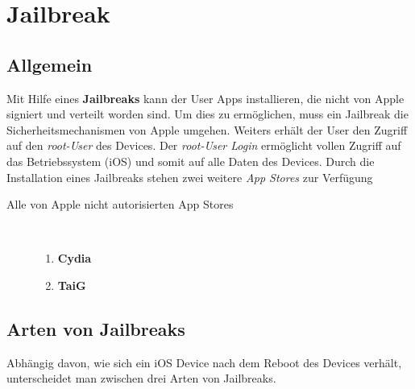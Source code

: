 %
%
% 
%
% 


\chapter{Jailbreak}
\label{ch:JB}

\section{Allgemein}
\label{sec:JBAllgemein}

Mit Hilfe eines \textbf{Jailbreaks} kann der User Apps installieren, die nicht von Apple signiert und verteilt worden sind. Um dies zu ermöglichen, muss ein Jailbreak die Sicherheitsmechanismen von Apple umgehen. Weiters erhält der User den Zugriff auf den \textit{\glqq root-User\grqq{}} des Devices. Der \textit{\glqq root-User Login\grqq{}} ermöglicht vollen Zugriff auf das Betriebssystem (iOS) und somit auf alle Daten des Devices. Durch die Installation eines Jailbreaks stehen zwei weitere \textit{\glqq App Stores\grqq{}} zur Verfügung

\begin{description}
\item[Alle von Apple nicht autorisierten App Stores]~
	\begin{enumerate}
	   	\item \textbf{Cydia} \cite{Cydia[1]}
		\item \textbf{TaiG}
	\end{enumerate}
\end{description}

\section{Arten von Jailbreaks}
\label{sec:JBArten}
Abhängig davon, wie sich ein iOS Device nach dem Reboot des Devices verhält, unterscheidet man zwischen drei Arten von Jailbreaks. 

